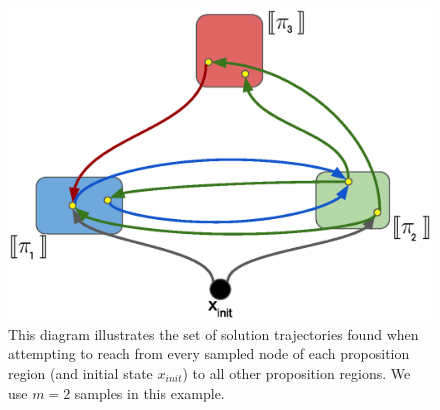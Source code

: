 \begin{figure}[hb]
    \hspace*{-1cm}
    \centering
    \includegraphics[scale=0.55]{./figures/quad_paths}
    \caption[Quadrotor planning with temporal logic specifications]{This diagram illustrates the set of solution trajectories found when attempting to reach from every sampled node of each proposition region (and initial state $x_{init}$) to all other proposition regions. We use $m=2$ samples in this example.}
\label{quad:fig:quad_paths}
\end{figure}

